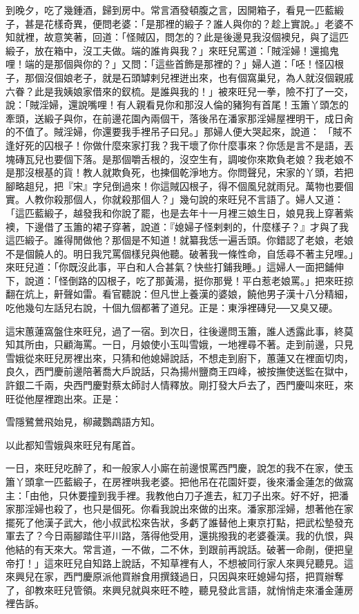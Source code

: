 到晚夕，吃了幾鍾酒，歸到房中。常言酒發頓腹之言，因開箱子，看見一匹藍緞子，甚是花樣奇異，便問老婆：「是那裡的緞子？誰人與你的？趁上實說。」老婆不知就裡，故意笑著，回道：「怪賊囚，問怎的？此是後邊見我沒個襖兒，與了這匹緞子，放在箱中，沒工夫做。端的誰肯與我？」來旺兒罵道：「賊淫婦！還搗鬼哩！端的是那個與你的？」又問：「這些首飾是那裡的？」婦人道：「呸！怪囚根子，那個沒個娘老子，就是石頭罅剌兒裡迸出來，也有個窩巢兒，為人就沒個親戚六眷？此是我姨娘家借來的釵梳。是誰與我的！」被來旺兒一拳，險不打了一交，說：「賊淫婦，還說嘴哩！有人親看見你和那沒人倫的豬狗有首尾！玉簫丫頭怎的牽頭，送緞子與你，在前邊花園內兩個干，落後吊在潘家那淫婦屋裡明干，成日肏的不值了。賊淫婦，你還要我手裡吊子曰兒。」那婦人便大哭起來，說道： 「賊不逢好死的囚根子！你做什麼來家打我？我干壞了你什麼事來？你恁是言不是語，丟塊磚瓦兒也要個下落。是那個嚼舌根的，沒空生有，調唆你來欺負老娘？我老娘不是那沒根基的貨！教人就欺負死，也揀個乾淨地方。你問聲兒，宋家的丫頭，若把腳略趄兒，把『宋』字兒倒過來！你這賊囚根子，得不個風兒就雨兒。萬物也要個實。人教你殺那個人，你就殺那個人？」幾句說的來旺兒不言語了。婦人又道：「這匹藍緞子，越發我和你說了罷，也是去年十一月裡三娘生日，娘見我上穿著紫襖，下邊借了玉簫的裙子穿著，說道：『媳婦子怪剌剌的，什麼樣子？』才與了我這匹緞子。誰得閒做他？那個是不知道！就纂我恁一遍舌頭。你錯認了老娘，老娘不是個饒人的。明日我咒罵個樣兒與他聽。破著我一條性命，自恁尋不著主兒哩。」來旺兒道：「你既沒此事，平白和人合甚氣？快些打鋪我睡。」這婦人一面把鋪伸下，說道：「怪倒路的囚根子，吃了那黃湯，挺你那覺！平白惹老娘罵。」把來旺掠翻在炕上，鼾聲如雷。看官聽說：但凡世上養漢的婆娘，饒他男子漢十八分精細，吃他幾句左話兒右說，十個九個都著了道兒。正是：東淨裡磚兒──又臭又硬。

這宋蕙蓮窩盤住來旺兒，過了一宿。到次日，往後邊問玉簫，誰人透露此事，終莫知其所由，只顧海罵。一日，月娘使小玉叫雪娥，一地裡尋不著。走到前邊，只見雪娥從來旺兒房裡出來，只猜和他媳婦說話，不想走到廚下，蕙蓮又在裡面切肉，良久，西門慶前邊陪著喬大戶說話，只為揚州鹽商王四峰，被按撫使送監在獄中，許銀二千兩，央西門慶對蔡太師討人情釋放。剛打發大戶去了，西門慶叫來旺，來旺從他屋裡跑出來。正是：

雪隱鷺鶯飛始見，柳藏鸚鵡語方知。

以此都知雪娥與來旺兒有尾首。

一日，來旺兒吃醉了，和一般家人小廝在前邊恨罵西門慶，說怎的我不在家，使玉簫丫頭拿一匹藍緞子，在房裡哄我老婆。把他吊在花園奸耍，後來潘金蓮怎的做窩主：「由他，只休要撞到我手裡。我教他白刀子進去，紅刀子出來。好不好，把潘家那淫婦也殺了，也只是個死。你看我說出來做的出來。潘家那淫婦，想著他在家擺死了他漢子武大，他小叔武松來告狀，多虧了誰替他上東京打點，把武松墊發充軍去了？今日兩腳踏住平川路，落得他受用，還挑撥我的老婆養漢。我的仇恨，與他結的有天來大。常言道，一不做，二不休，到跟前再說話。破著一命剮，便把皇帝打！」這來旺兒自知路上說話，不知草裡有人，不想被同行家人來興兒聽見。這來興兒在家，西門慶原派他買辦食用撰錢過日，只因與來旺媳婦勾搭，把買辦奪了，卻教來旺兒管領。來興兒就與來旺不睦，聽見發此言語，就悄悄走來潘金蓮房裡告訴。

